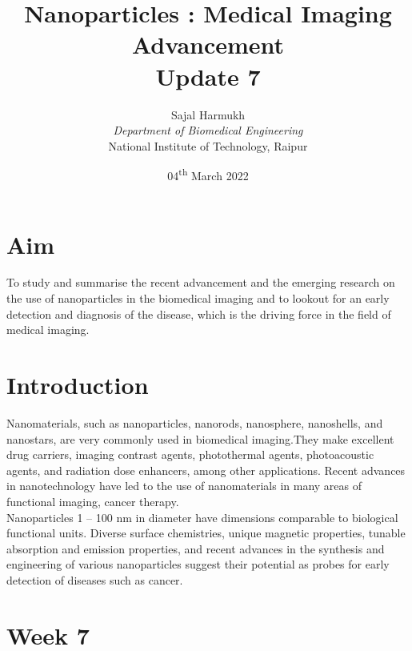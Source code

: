 \documentclass{article}
\title{\textbf{Nanoparticles : Medical Imaging Advancement\\Update 7}}
\author{Sajal Harmukh \\ \textit{Department of Biomedical Engineering} \\ National Institute of Technology, Raipur }
\date{04\textsuperscript{th} March 2022}
\begin{document}
\maketitle

\section*{Aim}
\large
To study and summarise the recent advancement and the emerging research on the use of nanoparticles in the biomedical imaging and to lookout for an early detection and diagnosis of the disease, which is the driving force in the field of medical imaging.

\section*{Introduction}
Nanomaterials, such as nanoparticles, nanorods, nanosphere, nanoshells, and nanostars, are
very commonly used in biomedical imaging.They make excellent drug carriers, imaging contrast agents, photothermal agents, photoacoustic agents, and radiation dose enhancers, among other applications. Recent advances in nanotechnology have led to the use of nanomaterials
in many areas of functional imaging, cancer therapy.\\ Nanoparticles 1 – 100 nm in diameter have dimensions comparable to biological functional units. Diverse surface chemistries, unique magnetic properties, tunable absorption and emission properties, and recent advances in the synthesis and engineering of various nanoparticles suggest their potential as probes for early detection of diseases such as cancer.
 


\section*{Week 7 }
\end{document}
